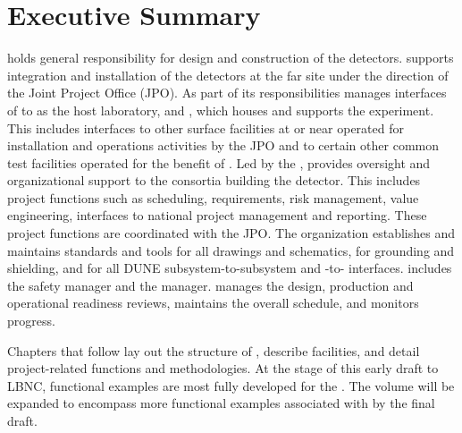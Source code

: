 \chapter{Executive Summary}
\label{vl:tc-execsum}


  holds general responsibility for
design and construction of the  detectors.  supports
integration and installation of the detectors at the far site under the direction
of the Joint Project Office (JPO).
As part of its responsibilities  manages interfaces of
 to \fnal as the host laboratory,  and
, which houses and supports the 
experiment. This includes interfaces to other surface facilities at or
near \surf operated for installation and operations activities by the JPO and to
certain other common test facilities operated for the benefit of
. Led by the  , 
 provides oversight and organizational support to the
consortia building the  detector.  This includes project
functions such as scheduling, requirements, risk management, value
engineering, interfaces to national project management and
reporting. These project functions are coordinated with the JPO.  The
 organization establishes and maintains standards and tools
for all drawings and schematics, for grounding and shielding, and for
all DUNE subsystem-to-subsystem and -to-
interfaces.   includes the  safety manager and
the   manager.   manages
the design, production and operational readiness reviews, maintains
the overall schedule, and monitors progress.

Chapters that follow lay out the structure of 
, describe  facilities, and detail
project-related functions and methodologies. At the stage of this
early draft to LBNC,   functional examples are most fully
developed for the  . The volume will be expanded to
encompass more functional examples associated with 
  by the final draft.

